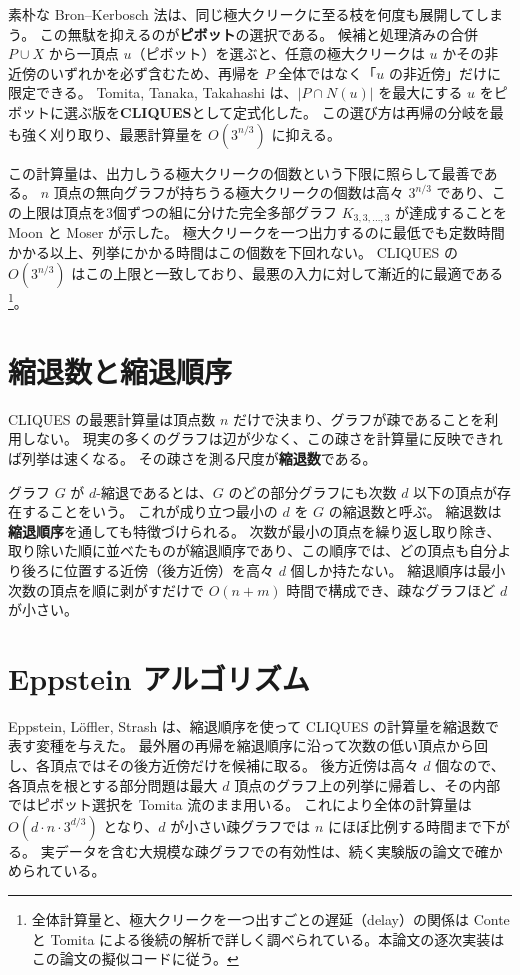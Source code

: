 素朴な Bron--Kerbosch 法は、同じ極大クリークに至る枝を何度も展開してしまう。
この無駄を抑えるのが\textbf{ピボット}の選択である。
候補と処理済みの合併 $P \cup X$ から一頂点 $u$（ピボット）を選ぶと、任意の極大クリークは $u$ かその非近傍のいずれかを必ず含むため、再帰を $P$ 全体ではなく「$u$ の非近傍」だけに限定できる。
Tomita, Tanaka, Takahashi は、$|P \cap N(u)|$ を最大にする $u$ をピボットに選ぶ版を\textbf{CLIQUES}として定式化した\cite{tomita2006}。
この選び方は再帰の分岐を最も強く刈り取り、最悪計算量を $O(3^{n/3})$ に抑える。

この計算量は、出力しうる極大クリークの個数という下限に照らして最善である。
$n$ 頂点の無向グラフが持ちうる極大クリークの個数は高々 $3^{n/3}$ であり、この上限は頂点を3個ずつの組に分けた完全多部グラフ $K_{3,3,\dots,3}$ が達成することを Moon と Moser が示した\cite{moon1965}。
極大クリークを一つ出力するのに最低でも定数時間かかる以上、列挙にかかる時間はこの個数を下回れない。
CLIQUES の $O(3^{n/3})$ はこの上限と一致しており、最悪の入力に対して漸近的に最適である\footnote{全体計算量と、極大クリークを一つ出すごとの遅延（delay）の関係は Conte と Tomita による後続の解析で詳しく調べられている\cite{conte2022}。本論文の逐次実装はこの論文の擬似コードに従う。}。

\section{縮退数と縮退順序}
\label{sec:degeneracy}

CLIQUES の最悪計算量は頂点数 $n$ だけで決まり、グラフが疎であることを利用しない。
現実の多くのグラフは辺が少なく、この疎さを計算量に反映できれば列挙は速くなる。
その疎さを測る尺度が\textbf{縮退数}である。

グラフ $G$ が $d$-縮退であるとは、$G$ のどの部分グラフにも次数 $d$ 以下の頂点が存在することをいう。
これが成り立つ最小の $d$ を $G$ の縮退数と呼ぶ。
縮退数は\textbf{縮退順序}を通しても特徴づけられる。
次数が最小の頂点を繰り返し取り除き、取り除いた順に並べたものが縮退順序であり、この順序では、どの頂点も自分より後ろに位置する近傍（後方近傍）を高々 $d$ 個しか持たない。
縮退順序は最小次数の頂点を順に剥がすだけで $O(n + m)$ 時間で構成でき、疎なグラフほど $d$ が小さい。

\section{Eppstein アルゴリズム}
\label{sec:eppstein}

Eppstein, L\"offler, Strash は、縮退順序を使って CLIQUES の計算量を縮退数で表す変種を与えた\cite{eppstein2010}。
最外層の再帰を縮退順序に沿って次数の低い頂点から回し、各頂点ではその後方近傍だけを候補に取る。
後方近傍は高々 $d$ 個なので、各頂点を根とする部分問題は最大 $d$ 頂点のグラフ上の列挙に帰着し、その内部ではピボット選択を Tomita 流のまま用いる。
これにより全体の計算量は $O(d \cdot n \cdot 3^{d/3})$ となり、$d$ が小さい疎グラフでは $n$ にほぼ比例する時間まで下がる。
実データを含む大規模な疎グラフでの有効性は、続く実験版の論文で確かめられている\cite{eppstein2013}。

